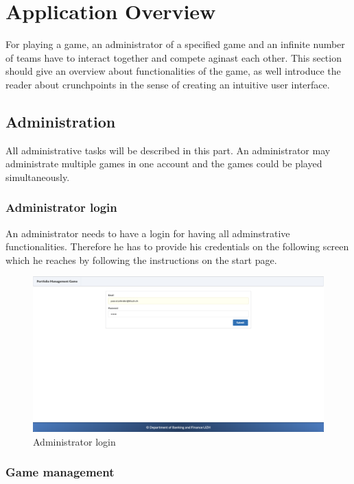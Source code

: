 \section{Application Overview}
For playing a game, an administrator of a specified game and an infinite number of teams have to interact together and compete aginast each other. This section should give an overview about functionalities of the game, as well introduce the reader about crunchpoints in the sense of creating an intuitive user interface.

\subsection{Administration}
All administrative tasks will be described in this part. An administrator may administrate multiple games in one account and the games could be played simultaneously.

\subsubsection{Administrator login}
An administrator needs to have a login for having all adminstrative functionalities. Therefore he has to provide his credentials on the following screen which he reaches by following the instructions on the start page.
\begin{figure}[h!]
  \centering
  \includegraphics[scale=0.2]{img/application-overview/administrator/01_login.png}
  \caption{Administrator login}
\end{figure}

\subsubsection{Game management}
